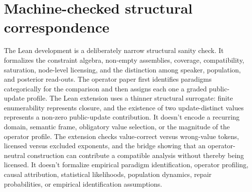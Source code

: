 \documentclass[12pt,letterpaper]{article}
\begin{document}
\section{Machine-checked structural correspondence}
\label{sec:lean-correspondence}

The Lean development is a deliberately narrow structural sanity check. It
formalizes the constraint algebra, non-empty assemblies, coverage,
compatibility, saturation, node-level licensing, and the distinction among
speaker, population, and posterior read-outs. The operator paper first
identifies paradigms categorically for the comparison and then assigns each one
a graded public-update profile. The Lean extension uses a thinner structural
surrogate: finite enumerability represents closure, and the existence of two
update-distinct values represents a non-zero public-update contribution. It
doesn't encode a recurring domain, semantic frame, obligatory value selection,
or the magnitude of the operator profile. The extension checks value-correct versus
wrong-value tokens, licensed versus excluded exponents, and the bridge showing
that an operator-neutral construction can contribute a compatible analysis
without thereby being licensed. It doesn't formalize empirical paradigm
identification, operator profiling, causal attribution, statistical likelihoods, population
dynamics, repair probabilities, or empirical identification assumptions.
\end{document}
